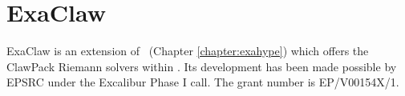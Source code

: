 \chapter{ExaClaw}
\label{chapter:exaclaw}

ExaClaw is an extension of \ExaHyPE\ (Chapter \ref{chapter:exahype}) which
offers the ClawPack Riemann solvers within \ExaHyPE.
Its development has been made possible by EPSRC under the Excalibur
Phase I call.
The grant number is EP/V00154X/1.

% 
% 
% 
% 
% 
% 
% 


